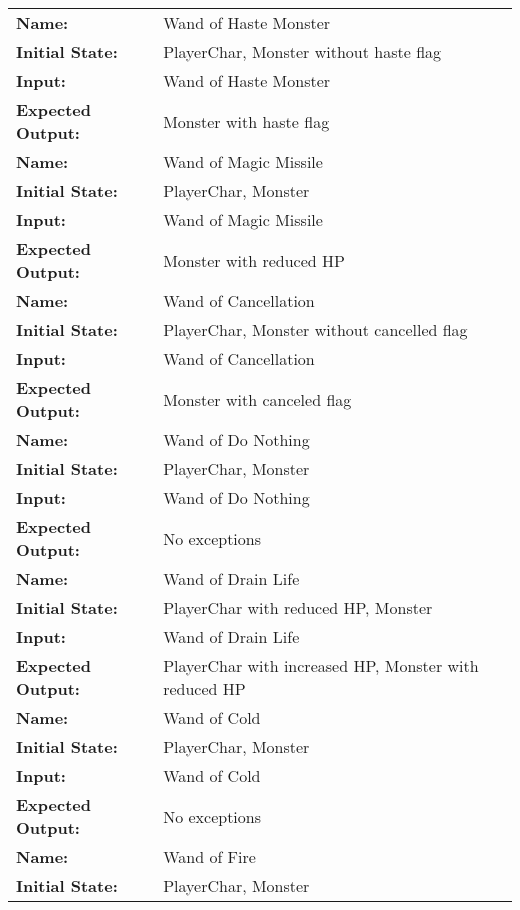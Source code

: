 \documentclass[12pt, titlepage]{article}
\begin{document}
\begin{center}
\begin{longtable}{ l | p{10cm} }
				\hline
				\rule{0pt}{1.5em}\textbf{Name:} & Wand of Haste Monster\\
				\textbf{Initial State:} & PlayerChar, Monster without haste flag\\
				\textbf{Input:} & Wand of Haste Monster\\
				\textbf{Expected Output:} & Monster with haste flag\\[0.6em]
				\hline
				\rule{0pt}{1.5em}\textbf{Name:} & Wand of Magic Missile\\
				\textbf{Initial State:} & PlayerChar, Monster\\
				\textbf{Input:} & Wand of Magic Missile\\
				\textbf{Expected Output:} & Monster with reduced HP\\[0.6em]
				\hline
				\rule{0pt}{1.5em}\textbf{Name:} & Wand of Cancellation\\
				\textbf{Initial State:} & PlayerChar, Monster without cancelled flag\\
				\textbf{Input:} & Wand of Cancellation\\
				\textbf{Expected Output:} & Monster with canceled flag\\[0.6em]
				\hline
				\rule{0pt}{1.5em}\textbf{Name:} & Wand of Do Nothing\\
				\textbf{Initial State:} & PlayerChar, Monster\\
				\textbf{Input:} & Wand of Do Nothing\\
				\textbf{Expected Output:} & No exceptions\\[0.6em]
				\hline
				\rule{0pt}{1.5em}\textbf{Name:} & Wand of Drain Life\\
				\textbf{Initial State:} & PlayerChar with reduced HP, Monster\\
				\textbf{Input:} & Wand of Drain Life\\
				\textbf{Expected Output:} & PlayerChar with increased HP, Monster with reduced HP\\[0.6em]
				\hline
				\rule{0pt}{1.5em}\textbf{Name:} & Wand of Cold\\
				\textbf{Initial State:} & PlayerChar, Monster\\
				\textbf{Input:} & Wand of Cold\\
				\textbf{Expected Output:} & No exceptions\\[0.6em]
				\hline
				\rule{0pt}{1.5em}\textbf{Name:} & Wand of Fire\\
				\textbf{Initial State:} & PlayerChar, Monster\\

\end{longtable}
\end{center}
\end{document}
